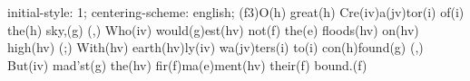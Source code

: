 initial-style: 1;
centering-scheme: english;
(f3)O(h) great(h) Cre(iv)a(jv)tor(i) of(i) the(h) sky,(g) (,)
Who(iv) would(g)est(hv) not(f) the(e) floods(hv) on(hv) high(hv) (;)
With(hv) earth(hv)ly(iv) wa(jv)ters(i) to(i) con(h)found(g) (,)
But(iv) mad'st(g) the(hv) fir(f)ma(e)ment(hv) their(f) bound.(f)
